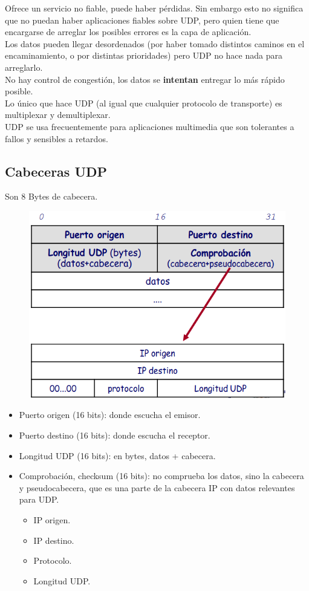 Ofrece un servicio no fiable, puede haber pérdidas. Sin embargo esto no significa que no puedan haber aplicaciones fiables sobre UDP, pero quien tiene que encargarse de arreglar los posibles errores es la capa de aplicación.\\

Los datos pueden llegar desordenados (por haber tomado distintos caminos en el encaminamiento, o por distintas prioridades) pero UDP no hace nada para arreglarlo.\\

No hay control de congestión, los datos se \textbf{intentan} entregar lo más rápido posible.\\ 

Lo único que hace UDP (al igual que cualquier protocolo de transporte) es multiplexar y demultiplexar.\\

UDP se usa frecuentemente para aplicaciones multimedia que son tolerantes a fallos y sensibles a retardos. 

\subsection{Cabeceras UDP}
Son 8 Bytes de cabecera. 
\begin{figure}[H]
    \centering
    \includegraphics[width=0.6\linewidth]{./images/cabecera-udp.png}
\end{figure}

\begin{itemize}
    \item Puerto origen (16 bits): donde escucha el emisor.
    \item Puerto destino (16 bits): donde escucha el receptor.
    \item Longitud UDP (16 bits): en bytes, datos + cabecera.
    \item Comprobación, checksum (16 bits): no comprueba los datos, sino la cabecera y pseudocabecera, que es una parte de la cabecera IP con datos relevantes para UDP.
        \begin{itemize}
            \item IP origen.
            \item IP destino.
            \item Protocolo.
            \item Longitud UDP.
        \end{itemize}
\end{itemize}


